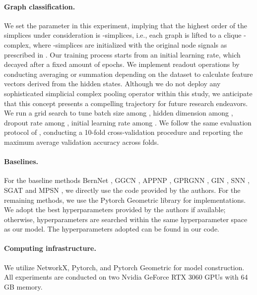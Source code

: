 \documentclass[letterpaper]{article} \usepackage{aaai24}
\theoremstyle{plain}
\theoremstyle{definition}
\theoremstyle{remark}
\begin{document}
\paragraph{Graph classification.}
We set the parameter  in this experiment, implying that the highest order of the simplices under consideration is -simplices, i.e., each graph is lifted to a clique -complex, where -simplices are initialized with the original node signals as prescribed in \cite{GIN2019}. 
Our training process starts from an initial learning rate, which decayed after a fixed amount of epochs.
We implement readout operations by conducting averaging or summation depending on the dataset to calculate feature vectors derived from the hidden states. Although we do not deploy any sophisticated simplicial complex pooling operator within this study, we anticipate that this concept presents a compelling trajectory for future research endeavors.
We run a grid search to tune batch size among , hidden dimension among , dropout rate among , initial learning rate among .  
We follow the same evaluation protocol of \cite{GIN2019}, conducting a 10-fold cross-validation procedure and reporting the maximum average validation accuracy across folds.


\paragraph{Baselines.}
For the baseline methods BernNet \cite{BernNet}, GGCN \cite{GGCN}, APPNP \cite{APPNP}, GPRGNN \cite{GPRGNN}, GIN \cite{GIN2019}, SNN \cite{SNN2020}, SGAT \cite{SGAT} and MPSN \cite{SWL2021}, we directly use the code provided by the authors. 
For the remaining methods, we use the Pytorch Geometric library \cite{graphwithPyTorch2019} for implementations. 
We adopt the best hyperparameters provided by the authors if available; otherwise, hyperparameters are searched within the same hyperparameter space as our model. The hyperparameters adopted can be found in our code.



\paragraph{Computing infrastructure.} 
We utilize NetworkX, Pytorch, and Pytorch Geometric for model construction. All experiments are conducted on two Nvidia GeForce RTX 3060 GPUs with 64 GB memory.
\end{document}
